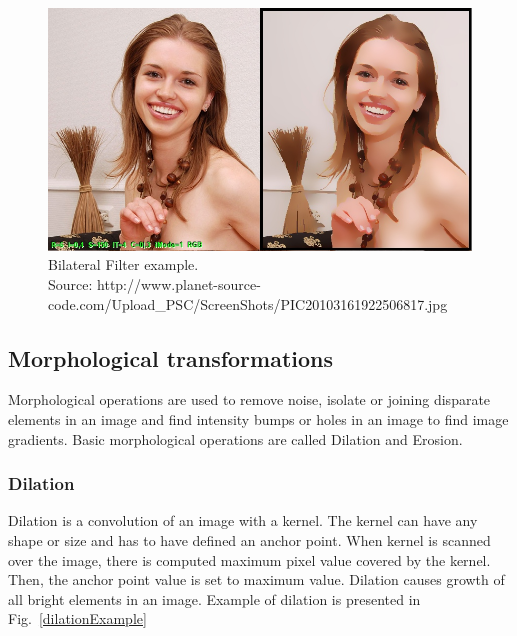 \documentclass[a4paper,onecolumn,oneside,12pt]{memoir}
\begin{document}
\begin{figure}[ht]
\begin{center}
\includegraphics[scale=0.6]{images/BilateralFilterExample.jpg}
\caption{Bilateral Filter example. \\
Source: http://www.planet-source-code.com/Upload\_PSC/ScreenShots/PIC20103161922506817.jpg}
\label{bilateralFilterExample}
\end{center}
\end{figure}

\subsection{Morphological transformations}

Morphological operations are used to remove noise, isolate or joining disparate elements
in an image and find intensity bumps or holes in an image to find image gradients. Basic 
morphological operations are called Dilation and Erosion.

\subsubsection{Dilation}

Dilation is a convolution of an image with a kernel. The kernel can have any shape or size and has
to have defined an anchor point. When kernel is scanned over the image, there is computed maximum
pixel value covered by the kernel. Then, the anchor point value is set to maximum value. Dilation
causes growth of all bright elements in an image. Example of dilation is presented in 
Fig.~\ref{dilationExample}
\end{document}
